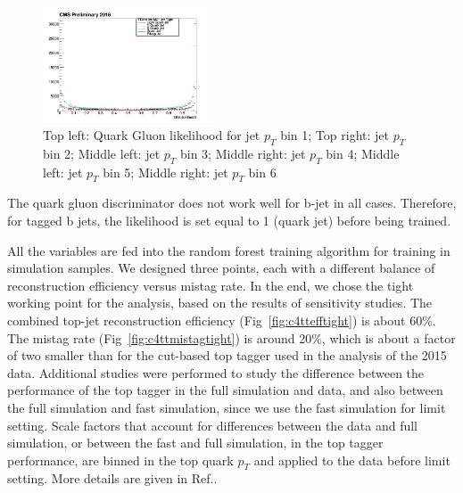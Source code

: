 \begin{figure}[htbp]
\begin{center}
  \includegraphics[width=0.45\textwidth]{sections/mc4/TopTagger/figures/_b_qglikelihoodjetptbin5_.png}
 \end{center}
 \caption{Top left: Quark Gluon likelihood for jet $p_{T}$ bin 1; Top right: jet $p_{T}$ bin 2; Middle left: jet $p_{T}$ bin 3; Middle right: jet $p_{T}$ bin 4; Middle left: jet $p_{T}$ bin 5; Middle right: jet $p_{T}$ bin 6}
 \label{fig:c4ttqgljetpt}
\end{figure}

The quark gluon discriminator does not work well for b-jet in all cases. Therefore, for tagged b jets, the likelihood is set equal to 1 (quark jet) before being trained.

All the variables are fed into the random forest\cite{Ho:1995:RDF:844379.844681} training algorithm for training in simulation samples. We designed three points, each with a different balance of reconstruction efficiency versus mistag rate. In the end, we chose the tight working point for the analysis, based on the results of sensitivity studies. The combined top-jet reconstruction efficiency (Fig~\ref{fig:c4ttefftight}) is about 60\%. The mistag rate (Fig~\ref{fig:c4ttmistagtight}) is around 20\%, which is about a factor of two smaller than for the cut-based top tagger used in the analysis of the 2015 data. Additional studies were performed to study the difference between the performance of the top tagger in the full simulation and data, and also between the full simulation and fast simulation, since we use the fast simulation for limit setting. Scale factors that account for differences between the data and full simulation, or between the fast and full simulation, in the top tagger performance, are binned in the top quark $p_{T}$ and applied to the data before limit setting. More details are given in Ref.\cite{AN-16-461}. 

